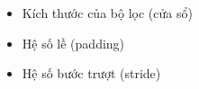 \begin{itemize}
\item Kích thước của bộ lọc (cửa sổ)
\item Hệ số lề (padding)
\item Hệ số bước trượt (stride)
\end{itemize}
 


